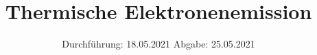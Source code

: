 

\subject{V504}
\title{Thermische Elektronenemission}
\date{%
  Durchführung: 18.05.2021
  \hspace{3em}
  Abgabe: 25.05.2021
}



\maketitle
\thispagestyle{empty}
\tableofcontents
\newpage







\printbibliography{}


